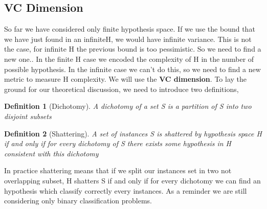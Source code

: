 \documentclass[main.tex]{subfiles}
\newtheorem{definition}{Definition}[section]
\begin{document}
\subsection{VC Dimension}
So far we have considered only finite hypothesis space. If we use the bound that we have just found in an infinite\footnotemark H, we would have infinite variance. This is not the case, for infinite H the previous bound is too pessimistic. So we need to find a new one.. In the finite H case we encoded the complexity of H in the number of possible hypothesis. In the infinite case we can't do this, so we need to find a new metric to measure H complexity. We will use the \textbf{VC dimension}. To lay the ground for our theoretical discussion, we need to introduce two definitions,
\begin{definition}[Dichotomy]
A dichotomy of a set S is a partition of S into two disjoint subsets
\end{definition}
\begin{definition}[Shattering]
A set of instances S is shattered by hypothesis space H if and only if for
every dichotomy of S there exists some hypothesis in H consistent with this
dichotomy
\end{definition}
In practice shattering means that if we split our instances set in two not overlapping subset, H shatters S if and only if for every dichotomy we can find an hypothesis which classify correctly every instances. As a reminder we are still considering only binary classification problems.
\end{document}
